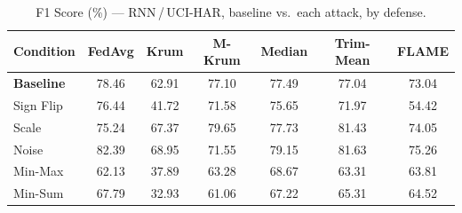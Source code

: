 \begin{table}[t]
\centering
\caption{F1 Score (\%) --- RNN\,/\,UCI-HAR, baseline vs.\ each attack, by defense.}
\label{tab:rnn_f1}
\footnotesize
\begin{tabular}{lcccccc}
\toprule
Condition & FedAvg & Krum & M-Krum & Median & Trim-Mean & FLAME \\
\midrule
\textbf{Baseline} & 78.46 & 62.91 & 77.10 & 77.49 & 77.04 & 73.04 \\
\midrule
Sign Flip & 76.44 & 41.72 & 71.58 & 75.65 & 71.97 & 54.42 \\
Scale & 75.24 & 67.37 & 79.65 & 77.73 & 81.43 & 74.05 \\
Noise & 82.39 & 68.95 & 71.55 & 79.15 & 81.63 & 75.26 \\
Min-Max & 62.13 & 37.89 & 63.28 & 68.67 & 63.31 & 63.81 \\
Min-Sum & 67.79 & 32.93 & 61.06 & 67.22 & 65.31 & 64.52 \\
\bottomrule
\end{tabular}
\end{table}
